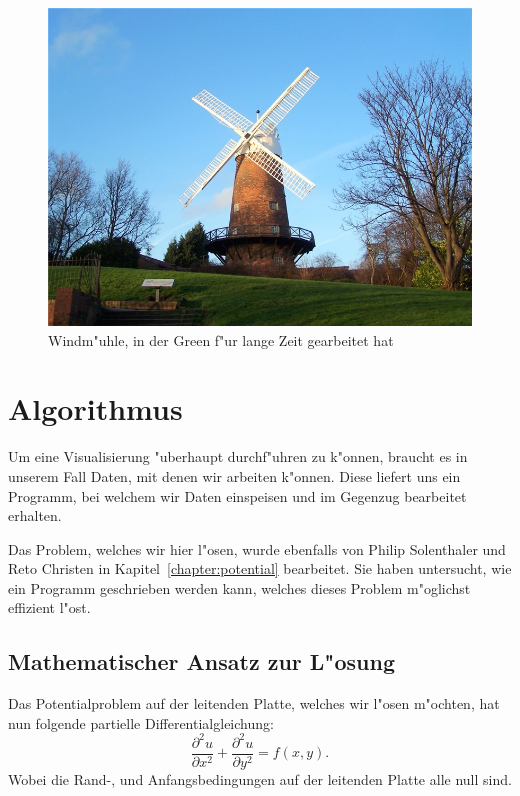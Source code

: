 \begin{refsection}
\begin{figure}                    
\centering 
\includegraphics[width=\hsize]{green/images/greens_windmill.jpg} 
\caption{Windm"uhle, in der Green f"ur lange Zeit gearbeitet hat} 
\label{fig:abb1} 
\end{figure} 
	
\section{Algorithmus}
Um eine Visualisierung "uberhaupt durchf"uhren zu k"onnen, braucht
es in unserem Fall Daten, mit denen wir arbeiten k"onnen. Diese
liefert uns ein Programm, bei welchem wir Daten einspeisen und im
Gegenzug bearbeitet erhalten.
	
Das Problem, welches wir hier l"osen, wurde ebenfalls von Philip
Solenthaler und Reto Christen in Kapitel~\ref{chapter:potential}
bearbeitet. Sie haben untersucht, wie
ein Programm geschrieben werden kann, welches dieses Problem
m"oglichst effizient l"ost.

\subsection{Mathematischer Ansatz zur L"osung}

Das Potentialproblem auf der leitenden Platte, welches wir l"osen
m"ochten, hat nun folgende partielle Differentialgleichung:
\begin{equation}\label{eq:gleichung}
\dfrac{\partial^2 u}{\partial x^2}+\dfrac{\partial^2 u}{\partial y^2} = f(x,y).
\end{equation}
Wobei die Rand-, und Anfangsbedingungen auf der leitenden Platte alle null sind. 
	

\end{refsection}
